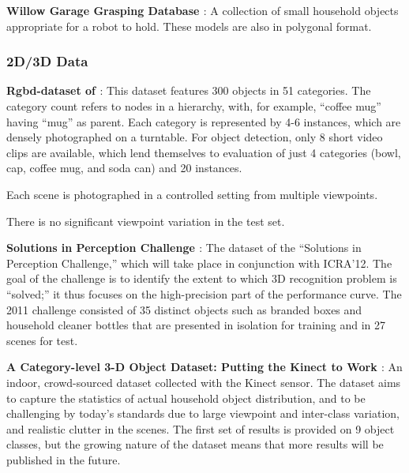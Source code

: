 {\bf Willow Garage Grasping Database \cite{wgdb}}:
A collection of small household objects appropriate for a robot to hold.
These models are also in polygonal format.

\subsubsection{2D/3D Data}
{\bf Rgbd-dataset of \cite{Lai2011}}:
This dataset features 300 objects in 51 categories.
The category count refers to nodes in a hierarchy, with, for example, ``coffee mug'' having ``mug'' as parent.
Each category is represented by 4-6 instances, which are densely photographed on a turntable.
For object detection, only 8 short video clips are available, which lend themselves to evaluation of just 4 categories (bowl, cap, coffee mug, and soda can) and 20 instances.

Each scene is photographed in a controlled setting from multiple viewpoints.

There is no significant viewpoint variation in the test set.

{\bf Solutions in Perception Challenge \cite{SIPC2011}}:
The dataset of the ``Solutions in Perception Challenge,'' which will take place in conjunction with ICRA'12.
The goal of the challenge is to identify the extent to which 3D recognition problem is ``solved;'' it thus focuses on the high-precision part of the performance curve.
The 2011 challenge consisted of 35 distinct objects such as branded boxes and household cleaner bottles that are presented in isolation for training and in 27 scenes for test.

{\bf A Category-level 3-D Object Dataset: Putting the Kinect to Work \cite{Janoch2011}}:
An indoor, crowd-sourced dataset collected with the Kinect sensor.
The dataset aims to capture the statistics of actual household object distribution, and to be challenging by today's standards due to large viewpoint and inter-class variation, and realistic clutter in the scenes.
The first set of results is provided on 9 object classes, but the growing nature of the dataset means that more results will be published in the future.

